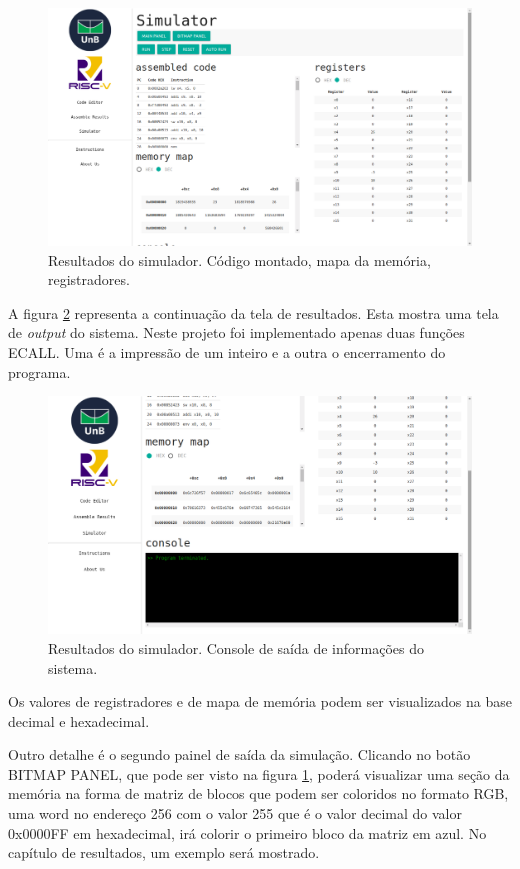 	\begin{figure}[h!]
	  \includegraphics[width=\linewidth]{img/simulator_results_1.png}
	  \caption{Resultados do simulador. Código montado, mapa da memória, registradores. }
	  \label{fig:simulator_results_1}
	\end{figure}

	A figura \ref{fig:simulator_results_2} representa a continuação da tela de resultados. Esta mostra uma tela de \textit{output} do sistema. Neste projeto foi implementado apenas duas funções ECALL. Uma é a impressão de um inteiro e a outra o encerramento do programa.  

	\begin{figure}[h!]
	  \includegraphics[width=\linewidth]{img/simulator_results_2.png}
	  \caption{Resultados do simulador. Console de saída de informações do sistema.}
	  \label{fig:simulator_results_2}
	\end{figure}

	Os valores de registradores e de mapa de memória podem ser visualizados na base decimal e hexadecimal.

	Outro detalhe é o segundo painel de saída da simulação. Clicando no botão BITMAP PANEL, que pode ser visto na figura \ref{fig:simulator_results_1}, poderá visualizar uma seção da memória na forma de matriz de blocos que podem ser coloridos no formato RGB, uma word no endereço 256 com o valor 255 que é o valor decimal do valor 0x0000FF em hexadecimal, irá colorir o primeiro bloco da matriz em azul. No capítulo de resultados, um exemplo será mostrado.

